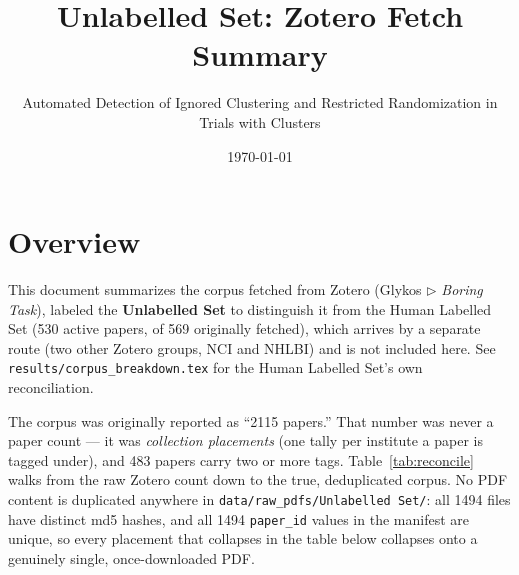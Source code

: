 \documentclass[11pt]{article}
\title{Unlabelled Set: Zotero Fetch Summary}
\author{Automated Detection of Ignored Clustering and Restricted Randomization in Trials with Clusters}
\date{\today}
\begin{document}
\maketitle

\section{Overview}

This document summarizes the corpus fetched from Zotero (Glykos \(\triangleright\) \emph{Boring Task}),
labeled the \textbf{Unlabelled Set} to distinguish it from the Human Labelled Set (530 active
papers, of 569 originally fetched), which arrives by a separate route (two other Zotero groups, NCI and
NHLBI) and is not included here. See \texttt{results/corpus\_breakdown.tex} for the Human Labelled Set's own
reconciliation.

The corpus was originally reported as ``2115 papers.'' That number was never a paper count --- it was
\emph{collection placements} (one tally per institute a paper is tagged under), and 483 papers carry
two or more tags. Table~\ref{tab:reconcile} walks from the raw Zotero count down to the true, deduplicated
corpus. No PDF content is duplicated anywhere in \texttt{data/raw\_pdfs/Unlabelled Set/}: all 1494 files have
distinct md5 hashes, and all 1494 \texttt{paper\_id} values in the manifest are unique, so every placement
that collapses in the table below collapses onto a genuinely single, once-downloaded PDF.
\end{document}
